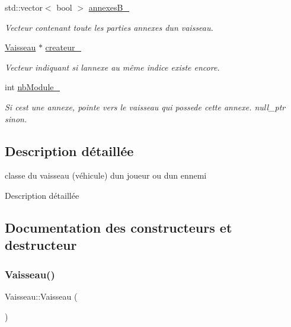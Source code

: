 \begin{DoxyCompactItemize}
std\+::vector$<$ bool $>$ \hyperlink{class_vaisseau_a584960419ccc6ae137c196a012d7eb9f}{annexes\+B\+\_\+}
\begin{DoxyCompactList}\small\item\em Vecteur contenant toute les parties annexes d\textquotesingle{}un vaisseau. \end{DoxyCompactList}\item 
\hyperlink{class_vaisseau}{Vaisseau} $\ast$ \hyperlink{class_vaisseau_a838e50295284e3b4996640054ab7ee30}{createur\+\_\+}
\begin{DoxyCompactList}\small\item\em Vecteur indiquant si l\textquotesingle{}annexe au même indice existe encore. \end{DoxyCompactList}\item 
int \hyperlink{class_vaisseau_a540cc03e47db59aad60d70be38a010ec}{nb\+Module\+\_\+}
\begin{DoxyCompactList}\small\item\em Si c\textquotesingle{}est une annexe, pointe vers le vaisseau qui possede cette annexe. null\+\_\+ptr sinon. \end{DoxyCompactList}\end{DoxyCompactItemize}


\subsection{Description détaillée}
classe du vaisseau (véhicule) d\textquotesingle{}un joueur ou d\textquotesingle{}un ennemi 

Description détaillée 

\subsection{Documentation des constructeurs et destructeur}
\mbox{\label{class_vaisseau_a86378a70f0d92fcc6c5c5973574b2b7d}} 
\subsubsection{\texorpdfstring{Vaisseau()}{Vaisseau()}}
{\footnotesize\ttfamily Vaisseau\+::\+Vaisseau (\begin{DoxyParamCaption}{ }\end{DoxyParamCaption})}



